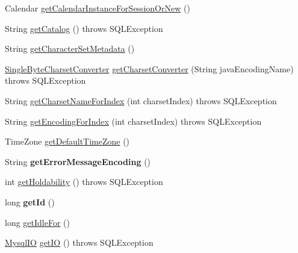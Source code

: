 \begin{DoxyCompactItemize}
\item 
Calendar \mbox{\hyperlink{classcom_1_1mysql_1_1jdbc_1_1_connection_impl_a0204e16a1a1df5ba25789dcf5e4d9fd0}{get\+Calendar\+Instance\+For\+Session\+Or\+New}} ()
\item 
String \mbox{\hyperlink{classcom_1_1mysql_1_1jdbc_1_1_connection_impl_a200118367aa1d33fe239bc8dcf5457dd}{get\+Catalog}} ()  throws S\+Q\+L\+Exception 
\item 
String \mbox{\hyperlink{classcom_1_1mysql_1_1jdbc_1_1_connection_impl_a92234918e0a6b565165c92bc467d3b54}{get\+Character\+Set\+Metadata}} ()
\item 
\mbox{\hyperlink{classcom_1_1mysql_1_1jdbc_1_1_single_byte_charset_converter}{Single\+Byte\+Charset\+Converter}} \mbox{\hyperlink{classcom_1_1mysql_1_1jdbc_1_1_connection_impl_a641ccc3402b1c74a6f3bb9422cfc758b}{get\+Charset\+Converter}} (String java\+Encoding\+Name)  throws S\+Q\+L\+Exception 
\item 
String \mbox{\hyperlink{classcom_1_1mysql_1_1jdbc_1_1_connection_impl_a2585f67a62bdf6127174e9f7dbc8a0b6}{get\+Charset\+Name\+For\+Index}} (int charset\+Index)  throws S\+Q\+L\+Exception 
\item 
String \mbox{\hyperlink{classcom_1_1mysql_1_1jdbc_1_1_connection_impl_a66f46efa858fb96251057b1dd48ad028}{get\+Encoding\+For\+Index}} (int charset\+Index)  throws S\+Q\+L\+Exception 
\item 
Time\+Zone \mbox{\hyperlink{classcom_1_1mysql_1_1jdbc_1_1_connection_impl_acaf3084d17a722f602ca106a051d02e6}{get\+Default\+Time\+Zone}} ()
\item 
\mbox{\label{classcom_1_1mysql_1_1jdbc_1_1_connection_impl_a8827fe5bc3f70fc3b3aa6bd2c4748786}} 
String {\bfseries get\+Error\+Message\+Encoding} ()
\item 
int \mbox{\hyperlink{classcom_1_1mysql_1_1jdbc_1_1_connection_impl_a4f47c0fcfb613c617972ad7969c5fd6f}{get\+Holdability}} ()  throws S\+Q\+L\+Exception 
\item 
\mbox{\label{classcom_1_1mysql_1_1jdbc_1_1_connection_impl_a0372f17e8ff978f0e0821d29a24736b5}} 
long {\bfseries get\+Id} ()
\item 
long \mbox{\hyperlink{classcom_1_1mysql_1_1jdbc_1_1_connection_impl_a6d675106c9edd73d2472401cf33b82a8}{get\+Idle\+For}} ()
\item 
\mbox{\hyperlink{classcom_1_1mysql_1_1jdbc_1_1_mysql_i_o}{Mysql\+IO}} \mbox{\hyperlink{classcom_1_1mysql_1_1jdbc_1_1_connection_impl_a4d22c7c85c9da8bc9ee56bd4e0ede41d}{get\+IO}} ()  throws S\+Q\+L\+Exception 

\end{DoxyCompactItemize}
